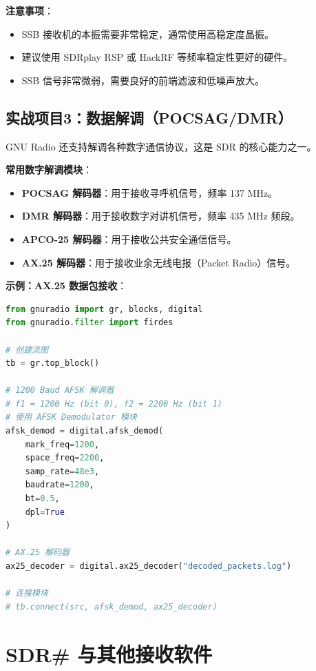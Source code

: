 \documentclass[12pt,UTF8]{ctexbook}
\begin{document}
\textbf{注意事项}：
\begin{itemize}[leftmargin=2cm]
    \item SSB 接收机的本振需要非常稳定，通常使用高稳定度晶振。
    \item 建议使用 SDRplay RSP 或 HackRF 等频率稳定性更好的硬件。
    \item SSB 信号非常微弱，需要良好的前端滤波和低噪声放大。
\end{itemize}

\subsection{实战项目3：数据解调（POCSAG/DMR）}
\label{subsec:digital_demod}

GNU Radio 还支持解调各种数字通信协议，这是 SDR 的核心能力之一。

\textbf{常用数字解调模块}：
\begin{itemize}[leftmargin=2cm]
    \item \textbf{POCSAG 解码器}：用于接收寻呼机信号，频率 137 MHz。
    \item \textbf{DMR 解码器}：用于接收数字对讲机信号，频率 435 MHz 频段。
    \item \textbf{APCO-25 解码器}：用于接收公共安全通信信号。
    \item \textbf{AX.25 解码器}：用于接收业余无线电报（Packet Radio）信号。
\end{itemize}

\textbf{示例：AX.25 数据包接收}：
\begin{lstlisting}[language=Python,caption={AX.25 数据包解码}]
from gnuradio import gr, blocks, digital
from gnuradio.filter import firdes

# 创建流图
tb = gr.top_block()

# 1200 Baud AFSK 解调器
# f1 = 1200 Hz (bit 0), f2 = 2200 Hz (bit 1)
# 使用 AFSK Demodulator 模块
afsk_demod = digital.afsk_demod(
    mark_freq=1200,
    space_freq=2200,
    samp_rate=48e3,
    baudrate=1200,
    bt=0.5,
    dpl=True
)

# AX.25 解码器
ax25_decoder = digital.ax25_decoder("decoded_packets.log")

# 连接模块
# tb.connect(src, afsk_demod, ax25_decoder)
\end{lstlisting}

\section{SDR\# 与其他接收软件}
\label{sec:sdr_software_rx}
\end{document}
